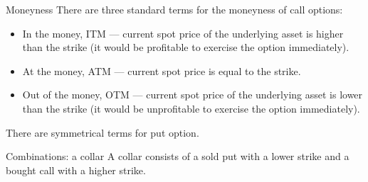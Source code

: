 \documentclass{beamer}
\begin{document}
\begin{frame}{Moneyness}
\justify
There are three standard terms for the \alert{moneyness} of call options:

\begin{itemize}
\justifying
\item In the money, ITM --- current spot price of the underlying asset is higher than the strike (it would be profitable to exercise the option immediately).
\item At the money, ATM --- current spot price is equal to the strike.
\item Out of the money, OTM --- current spot price of the underlying asset is lower than the strike (it would be unprofitable to exercise the option immediately).
\end{itemize}

\justify
There are symmetrical terms for put option.
\end{frame}



\begin{frame}{Combinations: a collar}
\justifying
A \alert{collar} consists of a sold put with a lower strike and a bought call with a higher strike.

\justifying
\centering
\end{frame}
\end{document}
